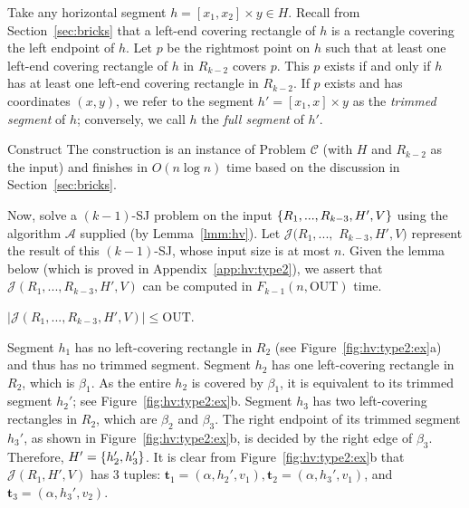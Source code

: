 \documentclass[acmsmall,review,anonymous]{acmart}
\def\vgap{\vspace{1mm}}
\def\extraspacing{\vspace{2mm} \noindent}
\def\A{\mathcal{A}}
\def\J{\mathcal{J}}
\def\out{\mathrm{OUT}}
\begin{document}
{{{\extraspacing {\bf Set $\bm{H'}$.} Take any horizontal segment $h = [x_1, x_2] \times y \in H$. Recall from Section~\ref{sec:bricks} that a left-end covering rectangle of $h$ is a rectangle covering the left endpoint of $h$. 
Let $p$ be the rightmost point on $h$ such that at least one left-end covering rectangle of $h$ in $R_{k-2}$ covers $p$. This $p$ exists if and only if $h$ has at least one left-end covering rectangle in $R_{k-2}$. If $p$ exists and has coordinates $(x, y)$, we refer to the segment $h' = [x_1, x] \times y$ as the {\em trimmed segment} of $h$; conversely, we call $h$ the {\em full segment} of $h'$.

\vgap 

Construct
The construction is an instance of Problem $\mathscr{C}$ (with $H$ and $R_{k-2}$ as the input) and finishes in $O(n \log n)$ time based on the discussion in Section~\ref{sec:bricks}.

\vgap 

Now, solve a $(k-1)$-SJ problem on the input $\{R_1, ..., R_{k-3}, H', V\}$ using the algorithm $\A$ supplied (by Lemma~\ref{lmm:hv}). Let $\J(R_1, ...,$ $R_{k-3}, H', V)$ represent the result of this $(k-1)$-SJ, whose input size is at most $n$. Given the lemma below (which is proved in Appendix~\ref{app:hv:type2}), we assert that $\J(R_1, ..., R_{k-3}, H', V)$ can be computed in $F_{k-1}(n, \out)$ time.

\begin{lemma} \label{lmm:hv:type2:recur-output}
    $|\J(R_1, ..., R_{k-3}, H', V)| \le \out$.
\end{lemma}

 Segment $h_1$ has no left-covering rectangle in $R_2$ (see Figure~\ref{fig:hv:type2:ex}a) and thus has no trimmed segment. Segment $h_2$ has one left-covering rectangle in $R_2$, which is $\beta_1$. As the entire $h_2$ is covered by $\beta_1$, it is equivalent to its trimmed segment $h_2'$; see Figure~\ref{fig:hv:type2:ex}b. Segment $h_3$ has two left-covering rectangles in $R_2$, which are $\beta_2$ and $\beta_3$. The right endpoint of its trimmed segment $h_3'$, as shown in Figure~\ref{fig:hv:type2:ex}b, is decided by the right edge of $\beta_3$. Therefore, $H' = \{h_2', h_3'\}$. It is clear from Figure~\ref{fig:hv:type2:ex}b that $\J(R_1, H', V)$ has 3 tuples: $\bm{t}_1 = (\alpha, h_2', v_1), \bm{t}_2 = (\alpha, h_3', v_1)$, and $\bm{t}_3 = (\alpha, h_3', v_2)$.
\done

}}}
\end{document}
